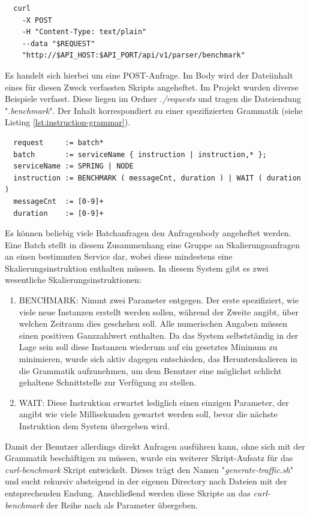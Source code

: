 \begin{verbatim}
  curl 
    -X POST 
    -H "Content-Type: text/plain" 
    --data "$REQUEST" 
    "http://$API_HOST:$API_PORT/api/v1/parser/benchmark"
\end{verbatim}

Es handelt sich hierbei um eine POST-Anfrage. Im Body wird der Dateiinhalt eines für diesen Zweck verfassten Skripts angeheftet. Im Projekt wurden diverse Beispiele verfasst. Diese liegen im Ordner \emph{./requests} und tragen die Dateiendung "\emph{.benchmark}". Der Inhalt korrespondiert zu einer spezifizierten Grammatik (siehe Listing \ref{lst:instruction-grammar}).

\label{lst:instruction-grammar}
\begin{verbatim}
  request     := batch*
  batch       := serviceName { instruction | instruction,* };
  serviceName := SPRING | NODE
  instruction := BENCHMARK ( messageCnt, duration ) | WAIT ( duration )
  messageCnt  := [0-9]+
  duration    := [0-9]+
\end{verbatim}

Es können beliebig viele Batchanfragen den Anfragenbody angeheftet werden. Eine Batch stellt in diesem Zusammenhang eine Gruppe an Skalierungsanfragen an einen bestimmten Service dar, wobei diese mindestens eine Skalierungsinstruktion enthalten müssen. In diesem System gibt es zwei wesentliche Skalierungsinstruktionen: 

\begin{enumerate}
  \item BENCHMARK: Nimmt zwei Parameter entgegen. Der erste spezifiziert, wie viele neue Instanzen erstellt werden sollen, während der Zweite angibt, über welchen Zeitraum dies geschehen soll. Alle numerischen Angaben müssen einen positiven Ganzzahlwert enthalten. Da das System selbstständig in der Lage sein soll diese Instanzen wiederum auf ein gesetztes Minimum zu minimieren, wurde sich aktiv dagegen entschieden, das Herunterskalieren in die Grammatik aufzunehmen, um dem Benutzer eine möglichst schlicht gehaltene Schnittstelle zur Verfügung zu stellen.
  \item WAIT: Diese Instruktion erwartet lediglich einen einzigen Parameter, der angibt wie viele Millisekunden gewartet werden soll, bevor die nächste Instruktion dem System übergeben wird. 
\end{enumerate}


Damit der Benutzer allerdings direkt Anfragen ausführen kann, ohne sich mit der Grammatik beschäftigen zu müssen, wurde ein weiterer Skript-Aufsatz 
für das \emph{curl-benchmark} Skript entwickelt. Dieses trägt den Namen "\emph{generate-traffic.sh}" und sucht rekursiv absteigend in der eigenen Directory nach Dateien mit der entsprechenden Endung. Anschließend werden diese Skripte an das \emph{curl-benchmark} der Reihe nach als Parameter übergeben.

